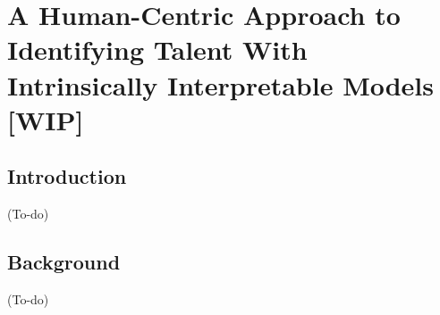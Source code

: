 

\chapter{\label{ch:iaicasestudy}A Human-Centric Approach to Identifying Talent With Intrinsically Interpretable Models [WIP]} %

\minitoc

\section{Introduction}
(To-do)

\section{Background}
(To-do)




